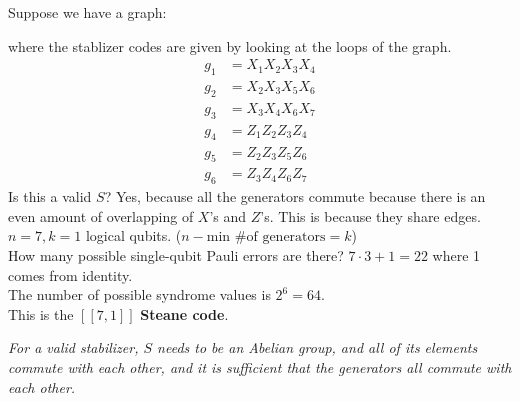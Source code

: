 \begin{example}
Suppose we have a graph: \\ 

\begin{center}
\end{center}
where the stablizer codes are given by looking at the loops of the graph.
\begin{align}
    g_1 &= X_1X_2X_3X_4 \\
    g_2 &= X_2X_3X_5X_6 \\
    g_3 &= X_3X_4X_6X_7  \\
    g_4 & =Z_1Z_2Z_3Z_4 \\
    g_5 &= Z_2Z_3Z_5Z_6 \\
    g_6 &= Z_3Z_4Z_6Z_7  
\end{align}
Is this a valid $S$? Yes, because all the generators commute because there is an even amount of overlapping of $X$'s and $Z$'s. This is because they share edges. \\
$n=7, k=1$ logical qubits. ($n - \text{min \# of generators} = k$) \\
How many possible single-qubit Pauli errors are there? $7\cdot 3 + 1 = 22$ where 1 comes from identity. \\
The number of possible syndrome values is $2^6 = 64$. \\
This is the $[[7,1]]$ \textbf{Steane code}. 
\end{example}

\textit{For a valid stabilizer, $S$ needs to be an Abelian group, and all of its elements commute with each other, and it is sufficient that the generators all commute with each other.}


